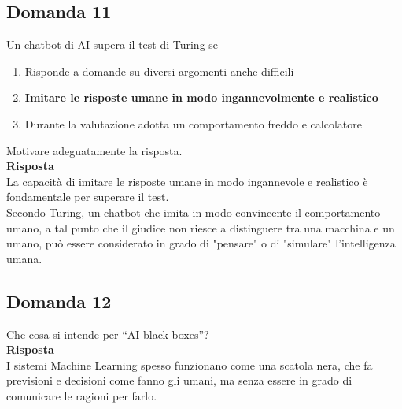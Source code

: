 \documentclass[../main.tex]{subfiles}
\begin{document}
	\subsection{Domanda 11}
	Un chatbot di AI supera il test di Turing se
	\begin{enumerate}
		\item Risponde a domande su diversi argomenti anche difficili 
		\item \textbf{Imitare le risposte umane in modo ingannevolmente e realistico}
		\item Durante la valutazione adotta un comportamento freddo e calcolatore 
	\end{enumerate}
	Motivare adeguatamente la risposta.\\
	\textbf{Risposta}\\
	La capacità di imitare le risposte umane in modo ingannevole e realistico è fondamentale per superare il test.\\
	Secondo Turing, un chatbot che imita in modo convincente il comportamento umano, a tal punto che il giudice non riesce a distinguere tra una macchina e un umano, può essere considerato in grado di "pensare" o di "simulare" l'intelligenza umana.
	\subsection{Domanda 12}
	Che cosa si intende per “AI black boxes”? \\
	\textbf{Risposta}\\
	I sistemi Machine Learning spesso funzionano come una scatola nera, che fa previsioni e decisioni come fanno gli umani, ma senza essere in grado di comunicare le ragioni per farlo.
\end{document}
